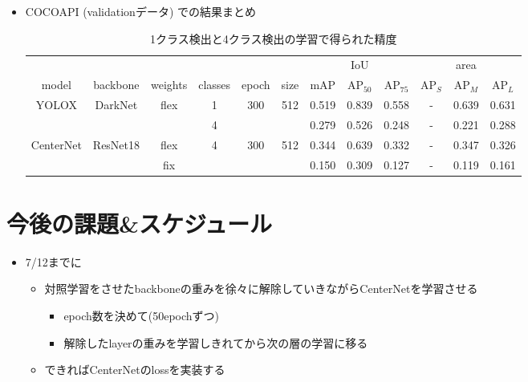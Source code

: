 \documentclass[a4j]{ujarticle}
\begin{document}
\clearpage

        \begin{itemize}
            \item COCOAPI (validationデータ) での結果まとめ

            \begin{table}[h]
                \centering
                \caption{1クラス検出と4クラス検出の学習で得られた精度}
                \label{tab:compare_models_sum}
                \begin{tabular}{cccccc|ccc|ccc}
                    & & & & & & & IoU & & & area & \\
                    model & backbone & weights & classes & epoch & size & mAP & AP$_{50}$ & AP$_{75}$ & AP$_S$ & AP$_M$ & AP$_L$ \\ \hline
                    \multirow{2}{*}{YOLOX\cite{yolox}} & \multirow{2}{*}{DarkNet} & \multirow{2}{*}{flex} & 1 & \multirow{2}{*}{300} & \multirow{2}{*}{512} & 0.519 & 0.839 & 0.558 & - & 0.639 & 0.631 \\
                    &  &  & 4 &  &  & 0.279 & 0.526 & 0.248 & - & 0.221 & 0.288 \\ \hline
                    \multirow{2}{*}{CenterNet\cite{centernet}} & \multirow{2}{*}{ResNet18} & flex & \multirow{2}{*}{4} & \multirow{2}{*}{300} & \multirow{2}{*}{512} & 0.344 & 0.639 & 0.332 & - & 0.347 & 0.326 \\
                    &  & fix &  &  &  & 0.150 & 0.309 & 0.127 & - & 0.119 & 0.161 \\
                \end{tabular}
            \end{table}

        \end{itemize}

    \section{今後の課題\&スケジュール}
        \begin{itemize}
            \item 7/12までに
            \begin{itemize}
                \item 対照学習をさせたbackboneの重みを徐々に解除していきながらCenterNet\cite{centernet}を学習させる
                \begin{itemize}
                    \item epoch数を決めて(50epochずつ)
                    \item 解除したlayerの重みを学習しきれてから次の層の学習に移る
                \end{itemize}
                \item できればCenterNet\cite{centernet}のlossを実装する
            \end{itemize}
        \end{itemize}
\end{document}
